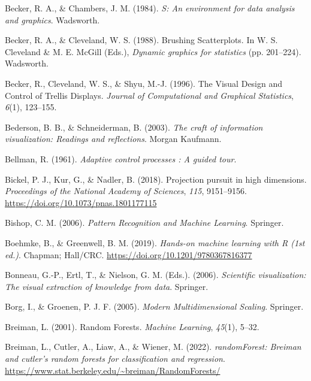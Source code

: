 \documentclass[
  letterpaper,
]{krantz}
\newlength{\cslhangindent}
\newenvironment{CSLReferences}[2] %
 {\begin{list}{}{%
  \setlength{\itemindent}{0pt}
  \setlength{\leftmargin}{0pt}
  \setlength{\parsep}{0pt}
  \ifodd #1
   \setlength{\leftmargin}{\cslhangindent}
   \setlength{\itemindent}{-1\cslhangindent}
  \fi
  \setlength{\itemsep}{#2\baselineskip}}}
 {\end{list}}
\begin{document}
\begin{CSLReferences}{1}{0}
Becker, R. A., \& Chambers, J. M. (1984). \emph{{S}: An environment for
data analysis and graphics}. Wadsworth.

Becker, R. A., \& Cleveland, W. S. (1988). {B}rushing {S}catterplots. In
W. S. Cleveland \& M. E. McGill (Eds.), \emph{Dynamic graphics for
statistics} (pp. 201--224). Wadsworth.

Becker, R., Cleveland, W. S., \& Shyu, M.-J. (1996). {T}he {V}isual
{D}esign and {C}ontrol of {T}rellis {D}isplays. \emph{Journal of
Computational and Graphical Statistics}, \emph{6}(1), 123--155.

Bederson, B. B., \& Schneiderman, B. (2003). \emph{The craft of
information visualization: Readings and reflections}. Morgan Kaufmann.

Bellman, R. (1961). \emph{Adaptive control processes : A guided tour}.

Bickel, P. J., Kur, G., \& Nadler, B. (2018). Projection pursuit in high
dimensions. \emph{Proceedings of the National Academy of Sciences},
\emph{115}, 9151--9156. \url{https://doi.org/10.1073/pnas.1801177115}

Bishop, C. M. (2006). \emph{Pattern {R}ecognition and {M}achine
{L}earning}. Springer.

Boehmke, B., \& Greenwell, B. M. (2019). \emph{Hands-on machine learning
with {R} (1st ed.)}. Chapman; Hall/CRC.
\url{https://doi.org/10.1201/9780367816377}

Bonneau, G.-P., Ertl, T., \& Nielson, G. M. (Eds.). (2006).
\emph{Scientific visualization: The visual extraction of knowledge from
data}. Springer.

Borg, I., \& Groenen, P. J. F. (2005). \emph{Modern {M}ultidimensional
{S}caling}. Springer.

Breiman, L. (2001). Random {F}orests. \emph{Machine Learning},
\emph{45}(1), 5--32.

Breiman, L., Cutler, A., Liaw, A., \& Wiener, M. (2022).
\emph{randomForest: Breiman and cutler's random forests for
classification and regression}.
\url{https://www.stat.berkeley.edu/~breiman/RandomForests/}


\end{CSLReferences}
\end{document}
